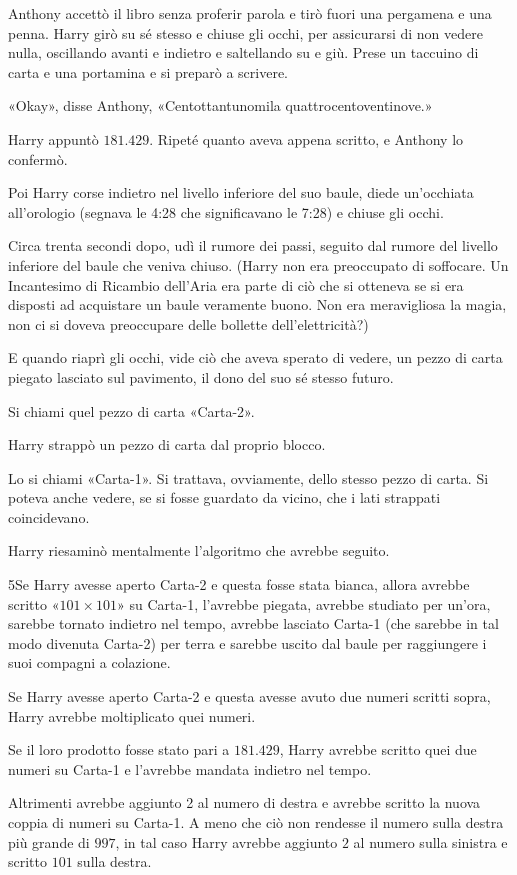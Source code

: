 Anthony accettò il libro senza proferir parola e tirò fuori una pergamena e una penna. Harry girò su sé stesso e chiuse gli occhi, per assicurarsi di non vedere nulla, oscillando avanti e indietro e saltellando su e giù. Prese un taccuino di carta e una portamina e si preparò a scrivere.

«Okay», disse Anthony, «Centottantunomila quattrocentoventinove.»

Harry appuntò $181.429$. Ripeté quanto aveva appena scritto, e Anthony lo confermò.

Poi Harry corse indietro nel livello inferiore del suo baule, diede un’occhiata all’orologio (segnava le 4:28 che significavano le 7:28) e chiuse gli occhi.

Circa trenta secondi dopo, udì il rumore dei passi, seguito dal rumore del livello inferiore del baule che veniva chiuso. (Harry non era preoccupato di soffocare. Un Incantesimo di Ricambio dell’Aria era parte di ciò che si otteneva se si era disposti ad acquistare un baule veramente buono. Non era meravigliosa la magia, non ci si doveva preoccupare delle bollette dell’elettricità?)

E quando riaprì gli occhi, vide ciò che aveva sperato di vedere, un pezzo di carta piegato lasciato sul pavimento, il dono del suo sé stesso futuro.

Si chiami quel pezzo di carta «Carta-2».

Harry strappò un pezzo di carta dal proprio blocco.

Lo si chiami «Carta-1». Si trattava, ovviamente, dello stesso pezzo di carta. Si poteva anche vedere, se si fosse guardato da vicino, che i lati strappati coincidevano.

Harry riesaminò mentalmente l’algoritmo che avrebbe seguito.

5Se Harry avesse aperto Carta-2  e questa fosse stata bianca, allora avrebbe scritto «$101 \times 101$» su Carta-1, l’avrebbe piegata, avrebbe studiato per un’ora, sarebbe tornato indietro nel tempo, avrebbe lasciato Carta-1 (che sarebbe in tal modo divenuta Carta-2) per terra e sarebbe uscito dal baule per raggiungere i suoi compagni a colazione.

Se Harry avesse aperto Carta-2 e questa avesse avuto due numeri scritti sopra, Harry avrebbe moltiplicato quei numeri.

Se il loro prodotto fosse stato pari a $181.429$, Harry avrebbe scritto quei due numeri su Carta-1 e l’avrebbe mandata indietro nel tempo.

Altrimenti avrebbe aggiunto 2 al numero di destra e avrebbe scritto la nuova coppia di numeri su Carta-1. A meno che ciò non rendesse il numero sulla destra più grande di $997$, in tal caso Harry avrebbe aggiunto $2$ al numero sulla sinistra e scritto $101$ sulla destra.

